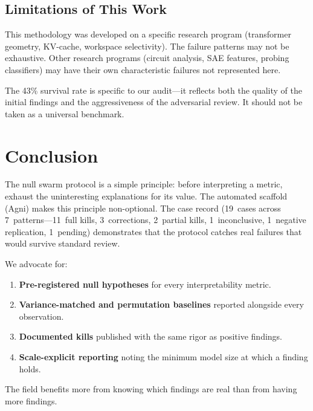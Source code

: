 \documentclass[11pt,a4paper]{article}
\begin{document}
\subsection{Limitations of This Work}

This methodology was developed on a specific research program
(transformer geometry, KV-cache, workspace selectivity). The failure
patterns may not be exhaustive. Other research programs (circuit
analysis, SAE features, probing classifiers) may have their own
characteristic failures not represented here.

The 43\% survival rate is specific to our audit---it reflects both the
quality of the initial findings and the aggressiveness of the adversarial
review. It should not be taken as a universal benchmark.

\section{Conclusion}
\label{sec:conclusion}

The null swarm protocol is a simple principle: before interpreting a
metric, exhaust the uninteresting explanations for its value. The
automated scaffold (Agni) makes this principle non-optional. The case
record (19~cases across 7~patterns---11~full kills, 3~corrections,
2~partial kills, 1~inconclusive, 1~negative replication, 1~pending)
demonstrates that
the protocol catches real failures that would survive standard review.

We advocate for:
\begin{enumerate}[nosep]
    \item \textbf{Pre-registered null hypotheses} for every
          interpretability metric.
    \item \textbf{Variance-matched and permutation baselines} reported
          alongside every observation.
    \item \textbf{Documented kills} published with the same rigor as
          positive findings.
    \item \textbf{Scale-explicit reporting} noting the minimum model size
          at which a finding holds.
\end{enumerate}

The field benefits more from knowing which findings are real than from
having more findings.
\end{document}
